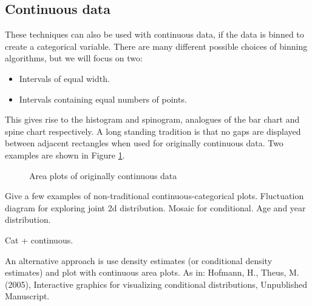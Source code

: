 \documentclass[letterpaper,oneside]{scrartcl}
\begin{document}
\subsection{Continuous data}
\label{sub:continuous_data}

These techniques can also be used with continuous data, if the data is binned to create a categorical variable. There are many different possible choices of binning algorithms, but we will focus on two:

\begin{itemize}
  \item Intervals of equal width.
  \item Intervals containing equal numbers of points.
\end{itemize}

This gives rise to the histogram and spinogram, analogues of the bar chart and spine chart respectively. A long standing tradition is that no gaps are displayed between adjacent rectangles when used for originally continuous data. Two examples are shown in Figure \ref{fig:cont-examples}.

\begin{figure}[htbp]
  \begin{center}
  \end{center}
  \caption{Area plots of originally continuous data}
  \label{fig:cont-examples}
\end{figure}

Give a few examples of non-traditional continuous-categorical plots.  Fluctuation diagram for exploring joint 2d distribution.  Mosaic for conditional.  Age and year distribution.  

Cat + continuous.

An alternative approach is use density estimates (or conditional density estimates) and plot with continuous area plots.  As in: Hofmann, H., Theus, M. (2005), Interactive graphics for visualizing conditional distributions, Unpublished Manuscript.

% 
% 
% 
% 
% 
% 
% 
% 
% 
% 
\end{document}
